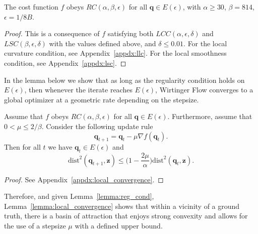 \begin{lem} \label{lemma:reg_cond}
	The cost function $f$ obeys $RC(\alpha, \beta, \epsilon)$ for all $\bm{q}\in E(\epsilon)$, with $\alpha\geq30$, $\beta=814$, $\epsilon=1/8B$. 
\end{lem} 
\begin{proof}
	This is a consequence of $f$ satisfying both $LCC(\alpha, \epsilon, \delta)$ and $LSC(\beta, \epsilon, \delta)$ with the values defined above, and $\delta\leq0.01$.
	For the local curvature condition, see Appendix~\ref{appdx:llc}. For the local smoothness condition, see Appendix~\ref{appdx:lsc}.
\end{proof}

In the lemma below we show that as long as the regularity condition holds on $E(\epsilon)$, then whenever the iterate reaches $E(\epsilon)$,	Wirtinger Flow converges to a global optimizer at a geometric rate depending on the stepsize. 

\begin{lem} \label{lemma:local_convergence}
	Assume that $f$ obeys $RC(\alpha, \beta, \epsilon)$ for all $\bm{q}\in E(\epsilon)$. Furthermore, assume that $0<\mu\leq2/\beta$. Consider the following update rule
	\begin{equation}
	\bm{q}_{t+1} = \bm{q}_t - \mu\nabla f(\bm{q}_t ).
	\end{equation}
	Then for all $t$ we have $\bm{q}_t \in E(\epsilon)$ and
	\begin{equation}
	\mathrm{dist}^2	(\bm{q}_{t+1} ,\bm{z}) \leq \Big(1 -\frac{2\mu}{\alpha}\Big) \mathrm{dist}^2	(\bm{q}_t,\bm{z}). \label{eqn:distance_convergence_rule}
	\end{equation}
\end{lem} 
\begin{proof}
	See Appendix~\ref{appdx:local_convergence}.
\end{proof}

Therefore, and given Lemma~\ref{lemma:reg_cond}, Lemma~\ref{lemma:local_convergence} shows that within a vicinity of a ground truth, there is a basin of attraction that enjoys strong convexity and allows for the use of a stepsize $\mu$ with a defined upper bound. 

